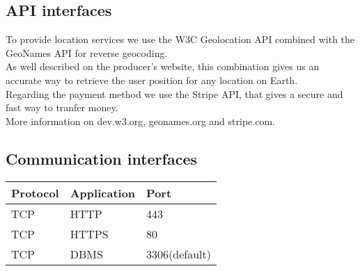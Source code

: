\subsection{API interfaces}
To provide location services we use the W3C Geolocation API combined with the GeoNames API for reverse geocoding. 
\\As well described on the producer's website, this combination gives us an accurate way to retrieve the user position for any location on Earth. 
\\Regarding the payment method we use the Stripe API, that gives a secure and fast way to tranfer money. 
\\More information on dev.w3.org, geonames.org and stripe.com.

\subsection{Communication interfaces}
\begin{center}
	\begin{tabular}{|l|l|l|}
	    \hline
	    Protocol & Application & Port \\\hline
	    \hline
	    TCP & HTTP & 443 \\\hline
	    TCP & HTTPS & 80 \\\hline
	    TCP & DBMS & 3306(default) \\\hline
	\end{tabular}
\end{center}